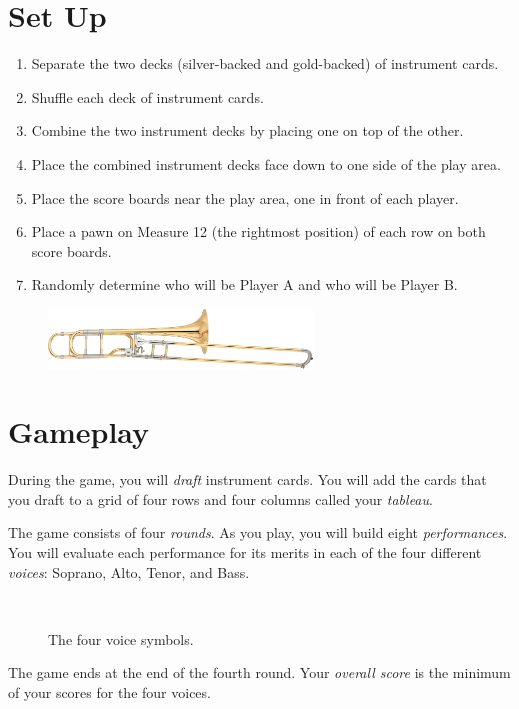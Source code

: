 \documentclass[a6paper, 12pt, parskip=half, DIV=14]{scrartcl}
\begin{document}
\section*{Set Up}
\begin{enumerate}[leftmargin=4ex]
  \item Separate the two decks (silver-backed and gold-backed) of instrument cards. 
  \item Shuffle each deck of instrument cards.
  \item Combine the two instrument decks by placing one on top of the other.
  \item Place the combined instrument decks face down to one side of the play area.
  \item Place the score boards near the play area, one in front of each player.
  \item Place a pawn on Measure 12 (the rightmost position) of each row on both score boards. 
  \item Randomly determine who will be Player A and who will be Player B.
\end{enumerate}

\vspace{0.25cm}

\begin{figure}[h]
\centering
\includegraphics[width=7cm]{Images/wikipedia_trombone.jpg}
\end{figure}


\newpage
\enlargethispage{1.75\baselineskip}
\section*{Gameplay}
During the game, you will \emph{draft} instrument cards. You will add the cards that you draft to a grid of four rows and four columns called your \emph{tableau}.

The game consists of four \emph{rounds}. As you play, you will build eight \emph{performances}.
You will evaluate each performance for its merits in each of the four different \emph{voices}: Soprano, Alto, Tenor, and Bass.
{

\begin{figure}[h]
\centering
\Huge
{} \ \  \ \  \ \ 
\caption*{The four voice symbols.}
\end{figure}
}
The game ends at the end of the fourth round. Your \emph{overall score} is the minimum of your scores for the four voices.
\end{document}

